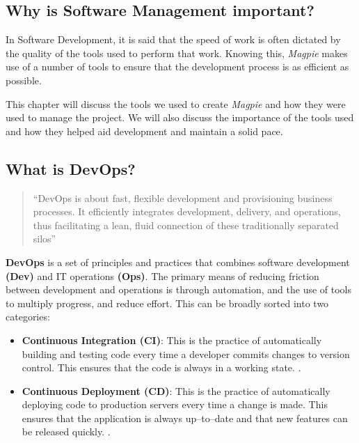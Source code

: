 \documentclass[preview]{standalone}
\begin{document}
\subsection{Why is Software Management important?}
\label{sec:software_management}
In Software Development, it is said that the speed of work is often dictated by
the quality of the tools used to perform that work. Knowing this,
\textit{Magpie} makes use of a number of tools to ensure that the development
process is as efficient as possible.

This chapter will discuss the tools we used to create \textit{Magpie} and how
they were used to manage the project. We will also discuss the importance of the
tools used and how they helped aid development and maintain a solid pace.

\subsection{What is DevOps?}
\label{sec:devops}

\begin{quote}
    ``DevOps is about fast, flexible development and provisioning business
    processes. It efficiently integrates development, delivery, and operations,
    thus facilitating a lean, fluid connection of these traditionally separated
    silos''
    \cite{DevOps}
\end{quote}

\textbf{DevOps} is a set of principles and practices that combines software
development \textbf{(Dev)} and IT operations \textbf{(Ops)}. The primary means
of reducing friction between development and operations is through automation,
and the use of tools to multiply progress, and reduce effort. This can be
broadly sorted into two categories:

\begin{itemize}
    \item{\textbf{Continuous Integration (CI)}: This is the practice of
        automatically building and testing code every time a developer commits
        changes to version control. This ensures that the code is always in a
        working state. \cite{DevOps}.}
        \vspace{1em}
    \item{\textbf{Continuous Deployment (CD)}: This is the practice of
        automatically deploying code to production servers every time a change
        is made. This ensures that the application is always up–to–date and that
        new features can be released quickly. \cite{DevOps}.}
\end{itemize}
\end{document}
